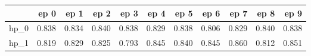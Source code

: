 \begin{tabular}{lrrrrrrrrrr}
\toprule
{} &   ep 0 &   ep 1 &   ep 2 &   ep 3 &   ep 4 &   ep 5 &   ep 6 &   ep 7 &   ep 8 &   ep 9 \\
\midrule
hp\_0 &  0.838 &  0.834 &  0.840 &  0.838 &  0.829 &  0.838 &  0.806 &  0.829 &  0.840 &  0.838 \\
hp\_1 &  0.819 &  0.829 &  0.825 &  0.793 &  0.845 &  0.840 &  0.845 &  0.860 &  0.812 &  0.851 \\
\bottomrule
\end{tabular}
